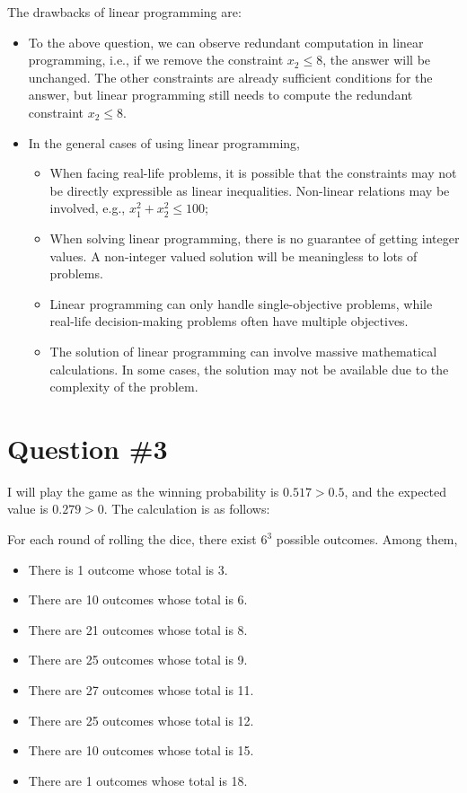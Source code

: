 \documentclass[conference]{styles/acmsiggraph}
\begin{document}
The drawbacks of linear programming are:
\begin{itemize}
	\setlength{\itemsep}{0pt}
	\setlength{\parsep}{0pt}
	\setlength{\parskip}{0pt}
    \item To the above question, we can observe redundant computation in linear programming, i.e., if we remove the constraint $x_2\leq 8$, the answer will be unchanged. The other constraints are already sufficient conditions for the answer, but linear programming still needs to compute the redundant constraint $x_2\leq 8$.
    \item In the general cases of using linear programming, 
    \begin{itemize}
        \item  When facing real-life problems, it is possible that the constraints may not be directly expressible as linear inequalities. Non-linear relations may be involved, e.g., $x_1^2 + x_2^2 \leq 100$;
        \item When solving linear programming, there is no guarantee of getting integer values. A non-integer valued solution will be meaningless to lots of problems.
        \item Linear programming can only handle single-objective problems, while real-life decision-making problems often have multiple objectives.
        \item The solution of linear programming can involve massive mathematical calculations. In some cases, the solution may not be available due to the complexity of the problem.
	\end{itemize}
\end{itemize}

\section{Question \#3}

I will play the game as the winning probability is $0.517 > 0.5$, and the expected value is $0.279 > 0$. The calculation is as follows:

For each round of rolling the dice, there exist $6^3$ possible outcomes. Among them, 
\begin{itemize}
	\setlength{\itemsep}{0pt}
	\setlength{\parsep}{0pt}
	\setlength{\parskip}{0pt}
	\item There is 1 outcome whose total is 3. 
	\item There are 10 outcomes whose total is 6.
	\item There are 21 outcomes whose total is 8.
	\item There are 25 outcomes whose total is 9.
	\item There are 27 outcomes whose total is 11.
	\item There are 25 outcomes whose total is 12.
	\item There are 10 outcomes whose total is 15.
	\item There are 1 outcomes whose total is 18.
\end{itemize}
\end{document}
